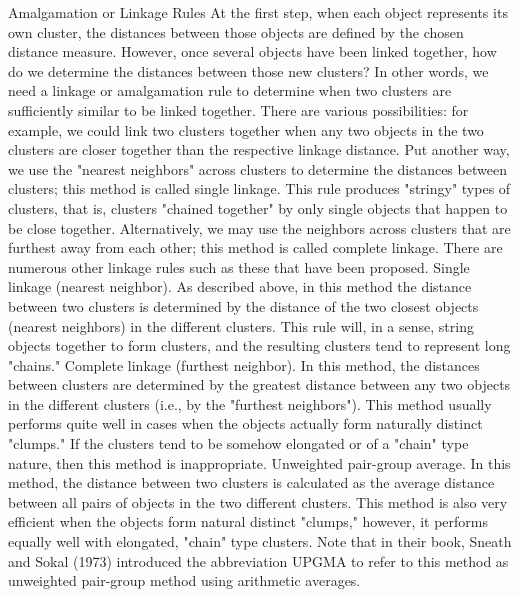 \documentclass[a4paper,12pt]{report}
\begin{document}
Amalgamation or Linkage Rules
At the first step, when each object represents its own cluster, the distances between those objects are defined by the chosen distance measure. However, once several objects have been linked together, how do we determine the distances between those new clusters? In other words, we need a linkage or amalgamation rule to determine when two clusters are sufficiently similar to be linked together. There are various possibilities: for example, we could link two clusters together when any two objects in the two clusters are closer together than the respective linkage distance. Put another way, we use the "nearest neighbors" across clusters to determine the distances between clusters; this method is called single linkage. This rule produces "stringy" types of clusters, that is, clusters "chained together" by only single objects that happen to be close together. Alternatively, we may use the neighbors across clusters that are furthest away from each other; this method is called complete linkage. There are numerous other linkage rules such as these that have been proposed.
Single linkage (nearest neighbor). As described above, in this method the distance between two clusters is determined by the distance of the two closest objects (nearest neighbors) in the different clusters. This rule will, in a sense, string objects together to form clusters, and the resulting clusters tend to represent long "chains."
Complete linkage (furthest neighbor). In this method, the distances between clusters are determined by the greatest distance between any two objects in the different clusters (i.e., by the "furthest neighbors"). This method usually performs quite well in cases when the objects actually form naturally distinct "clumps." If the clusters tend to be somehow elongated or of a "chain" type nature, then this method is inappropriate.
Unweighted pair-group average. In this method, the distance between two clusters is calculated as the average distance between all pairs of objects in the two different clusters. This method is also very efficient when the objects form natural distinct "clumps," however, it performs equally well with elongated, "chain" type clusters. Note that in their book, Sneath and Sokal (1973) introduced the abbreviation UPGMA to refer to this method as unweighted pair-group method using arithmetic averages.
\end{document}
